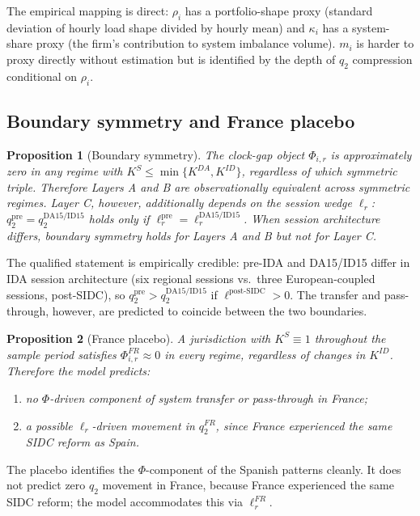 \documentclass[11pt]{article}
\newtheorem{proposition}{Proposition}
\begin{document}
The empirical mapping is direct: $\rho_{i}$ has a portfolio-shape proxy (standard deviation of hourly load shape divided by hourly mean) and $\kappa_{i}$ has a system-share proxy (the firm's contribution to system imbalance volume). $m_{i}$ is harder to proxy directly without estimation but is identified by the depth of $q_{2}$ compression conditional on $\rho_{i}$.

\subsection{Boundary symmetry and France placebo}
\label{sec:model-symmetry}

\begin{proposition}[Boundary symmetry]
\label{prop:boundary}
The clock-gap object $\Phi_{i,r}$ is approximately zero in any regime with $K^{S} \le \min\{K^{DA}, K^{ID}\}$, regardless of which symmetric triple. Therefore Layers A and B are observationally equivalent across symmetric regimes. Layer C, however, additionally depends on the session wedge $\ell_{r}$: $q_{2}^{\text{pre}} = q_{2}^{\text{DA15/ID15}}$ holds only if $\ell^{\text{pre}}_{r} = \ell^{\text{DA15/ID15}}_{r}$. When session architecture differs, boundary symmetry holds for Layers A and B but not for Layer C.
\end{proposition}

The qualified statement is empirically credible: pre-IDA and DA15/ID15 differ in IDA session architecture (six regional sessions vs.\ three European-coupled sessions, post-SIDC), so $q_{2}^{\text{pre}} > q_{2}^{\text{DA15/ID15}}$ if $\ell^{\text{post-SIDC}} > 0$. The transfer and pass-through, however, are predicted to coincide between the two boundaries.

\begin{proposition}[France placebo]
\label{prop:france}
A jurisdiction with $K^{S} \equiv 1$ throughout the sample period satisfies $\Phi^{FR}_{i,r} \approx 0$ in every regime, regardless of changes in $K^{ID}$. Therefore the model predicts:
\begin{enumerate}[label=(\roman*)]
\item no $\Phi$-driven component of system transfer or pass-through in France;
\item a possible $\ell_{r}$-driven movement in $q_{2}^{FR}$, since France experienced the same SIDC reform as Spain.
\end{enumerate}
\end{proposition}

The placebo identifies the $\Phi$-component of the Spanish patterns cleanly. It does not predict zero $q_{2}$ movement in France, because France experienced the same SIDC reform; the model accommodates this via $\ell^{FR}_{r}$.
\end{document}
